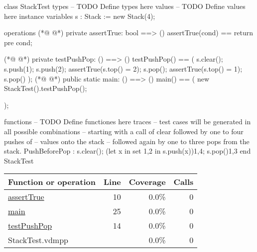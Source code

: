 \begin{vdmpp}[breaklines=true]
class StackTest
types
-- TODO Define types here
values
-- TODO Define values here
 instance variables
                s : Stack := new Stack(4);

operations
(*@
\label{assertTrue:10}
@*)
                private assertTrue: bool ==> ()
                assertTrue(cond) == return
                pre cond;
                        
(*@
\label{testPushPop:14}
@*)
                private testPushPop: () ==> ()
                testPushPop() ==
                (
                        s.clear();
                        s.push(1);
                        s.push(2);
                        assertTrue(s.top() = 2);
                        s.pop();
                        assertTrue(s.top() = 1);
                        s.pop()
                );
(*@
\label{main:25}
@*)
                public static main: () ==> ()
                main() ==
                (
                        new StackTest().testPushPop();
                        
                );

functions
-- TODO Define functiones here
 traces
        -- test cases will be generated in all possible combinations
        -- starting with a call of clear followed by one to four pushes of
    -- values onto the stack
        -- followed again by one to three pops from the stack.
        PushBeforePop :
        s.clear();
        (let x in set {1,2} in s.push(x)){1,4};
        s.pop(){1,3}
end StackTest
\end{vdmpp}
\bigskip
\begin{longtable}{|l|r|r|r|}
\hline
Function or operation & Line & Coverage & Calls \\
\hline
\hline
\hyperref[assertTrue:10]{assertTrue} & 10&0.0\% & 0 \\
\hline
\hyperref[main:25]{main} & 25&0.0\% & 0 \\
\hline
\hyperref[testPushPop:14]{testPushPop} & 14&0.0\% & 0 \\
\hline
\hline
StackTest.vdmpp & & 0.0\% & 0 \\
\hline
\end{longtable}

